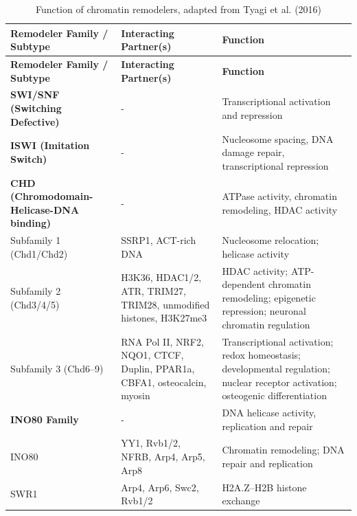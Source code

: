 \documentclass[11pt]{book}
\begin{document}
\begingroup
\small
\begin{longtable}{>{\raggedright\arraybackslash}p{3.5cm} >{\raggedright\arraybackslash}p{5cm} >{\raggedright\arraybackslash}p{6.5cm}}
    
    \caption{Function of chromatin remodelers, adapted from Tyagi et al. (2016)}
    \label{tab:remodelers} \\
    \toprule
    \textbf{Remodeler Family / Subtype} & \textbf{Interacting Partner(s)} & \textbf{Function} \\
    \midrule
    \endfirsthead
    
    \toprule
    \textbf{Remodeler Family / Subtype} & \textbf{Interacting Partner(s)} & \textbf{Function} \\
    \midrule
    \endhead
    
    \textbf{SWI/SNF (Switching Defective)} & - & Transcriptional activation and repression \\
    
    \textbf{ISWI (Imitation Switch)} & - & Nucleosome spacing, DNA damage repair, transcriptional repression \\
    
    \textbf{CHD (Chromodomain-Helicase-DNA binding)} & - & ATPase activity, chromatin remodeling, HDAC activity \\
    
    \quad Subfamily 1 (Chd1/Chd2) & SSRP1, ACT-rich DNA & Nucleosome relocation; helicase activity \\
    
    \quad Subfamily 2 (Chd3/4/5) & H3K36, HDAC1/2, ATR, TRIM27, TRIM28, unmodified histones, H3K27me3 & HDAC activity; ATP-dependent chromatin remodeling; epigenetic repression; neuronal chromatin regulation \\
    
    \quad Subfamily 3 (Chd6–9) & RNA Pol II, NRF2, NQO1, CTCF, Duplin, PPAR1a, CBFA1, osteocalcin, myosin & Transcriptional activation; redox homeostasis; developmental regulation; nuclear receptor activation; osteogenic differentiation \\
    
    \textbf{INO80 Family} & - & DNA helicase activity, replication and repair \\
    
    \quad INO80 & YY1, Rvb1/2, NFRB, Arp4, Arp5, Arp8 & Chromatin remodeling; DNA repair and replication \\
    
    \quad SWR1 & Arp4, Arp6, Swc2, Rvb1/2 & H2A.Z–H2B histone exchange \\
    \bottomrule
\end{longtable}
\endgroup
\end{document}
